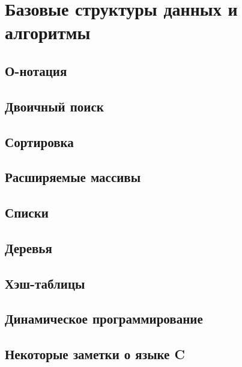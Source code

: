 \chapter{Базовые структуры данных и алгоритмы}
\label{ch:basic-ds}

\section{О-нотация}
\label{sec:o-notation}
\section{Двоичный поиск}
\label{sec:binary-search}
\section{Сортировка}
\label{sec:sorting}
\section{Расширяемые массивы}
\label{sec:ext-arrays}
\section{Списки}
\label{sec:lists}
\section{Деревья}
\label{sec:trees}
\section{Хэш-таблицы}
\label{sec:hash-tables}
\section{Динамическое программирование}
\label{sec:dyn-programming}
\section{Некоторые заметки о языке C}
\label{sec:c-notes}
